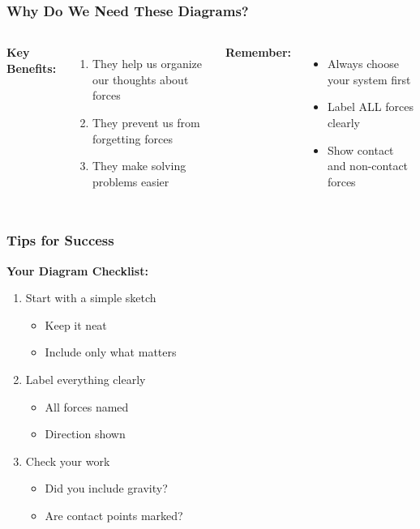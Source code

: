 \documentclass{beamer}
\begin{document}
\begin{frame}
\frametitle{Why Do We Need These Diagrams?}
\begin{columns}
\textbf{Key Benefits:}
\begin{enumerate}
    \item They help us organize our thoughts about forces
    \item They prevent us from forgetting forces
    \item They make solving problems easier
\end{enumerate}

\vspace{0.3cm}
\textbf{Remember:}
\begin{itemize}
    \item Always choose your system first
    \item Label ALL forces clearly
    \item Show contact and non-contact forces
\end{itemize}

\end{columns}
\end{frame}

\begin{frame}
\frametitle{Tips for Success}
\textbf{Your Diagram Checklist:}
\begin{enumerate}
    \item Start with a simple sketch
    \begin{itemize}
        \item[\Square] Keep it neat
        \item[\Square] Include only what matters
    \end{itemize}
    
    \item Label everything clearly
    \begin{itemize}
        \item[\Square] All forces named
        \item[\Square] Direction shown
    \end{itemize}
    
    \item Check your work
    \begin{itemize}
        \item[\Square] Did you include gravity?
        \item[\Square] Are contact points marked?
    \end{itemize}
\end{enumerate}

\end{frame}
\end{document}
